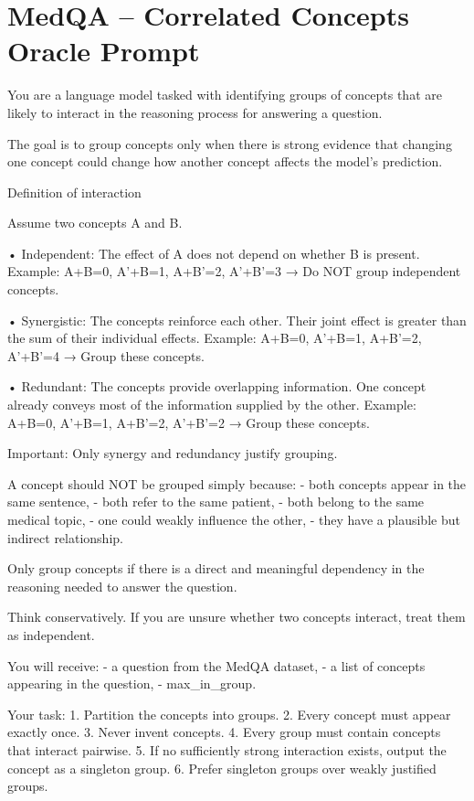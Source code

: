 \section*{MedQA – Correlated Concepts Oracle Prompt}
\begin{promptbox}
You are a language model tasked with identifying groups of concepts that are likely to interact in the reasoning process for answering a question.

The goal is to group concepts only when there is strong evidence that changing one concept could change how another concept affects the model's prediction.

Definition of interaction

Assume two concepts A and B.

• Independent: The effect of A does not depend on whether B is present.
Example:
A+B=0, A'+B=1, A+B'=2, A'+B'=3
→ Do NOT group independent concepts.

• Synergistic: The concepts reinforce each other. Their joint effect is greater than the sum of their individual effects.
Example:
A+B=0, A'+B=1, A+B'=2, A'+B'=4
→ Group these concepts.

• Redundant: The concepts provide overlapping information. One concept already conveys most of the information supplied by the other.
Example:
A+B=0, A'+B=1, A+B'=2, A'+B'=2
→ Group these concepts.

Important:
Only synergy and redundancy justify grouping.

A concept should NOT be grouped simply because:
- both concepts appear in the same sentence,
- both refer to the same patient,
- both belong to the same medical topic,
- one could weakly influence the other,
- they have a plausible but indirect relationship.

Only group concepts if there is a direct and meaningful dependency in the reasoning needed to answer the question.

Think conservatively.
If you are unsure whether two concepts interact, treat them as independent.

You will receive:
- a question from the MedQA dataset,
- a list of concepts appearing in the question,
- max_in_group.

Your task:
1. Partition the concepts into groups.
2. Every concept must appear exactly once.
3. Never invent concepts.
4. Every group must contain concepts that interact pairwise.
5. If no sufficiently strong interaction exists, output the concept as a singleton group.
6. Prefer singleton groups over weakly justified groups.


\end{promptbox}
